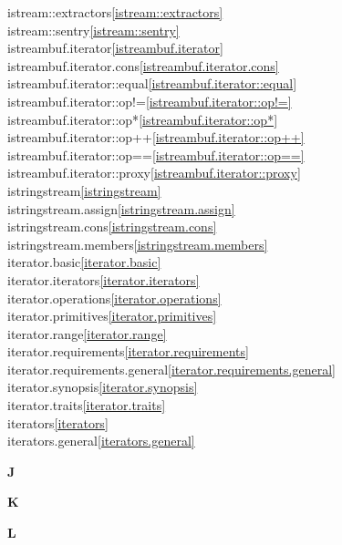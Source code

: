 \begin{multicols}{2}
istream::extractors\quad\ref{istream::extractors}\\
istream::sentry\quad\ref{istream::sentry}\\
istreambuf.iterator\quad\ref{istreambuf.iterator}\\
istreambuf.iterator.cons\quad\ref{istreambuf.iterator.cons}\\
istreambuf.iterator::equal\quad\ref{istreambuf.iterator::equal}\\
istreambuf.iterator::op!=\quad\ref{istreambuf.iterator::op!=}\\
istreambuf.iterator::op*\quad\ref{istreambuf.iterator::op*}\\
istreambuf.iterator::op++\quad\ref{istreambuf.iterator::op++}\\
istreambuf.iterator::op==\quad\ref{istreambuf.iterator::op==}\\
istreambuf.iterator::proxy\quad\ref{istreambuf.iterator::proxy}\\
istringstream\quad\ref{istringstream}\\
istringstream.assign\quad\ref{istringstream.assign}\\
istringstream.cons\quad\ref{istringstream.cons}\\
istringstream.members\quad\ref{istringstream.members}\\
iterator.basic\quad\ref{iterator.basic}\\
iterator.iterators\quad\ref{iterator.iterators}\\
iterator.operations\quad\ref{iterator.operations}\\
iterator.primitives\quad\ref{iterator.primitives}\\
iterator.range\quad\ref{iterator.range}\\
iterator.requirements\quad\ref{iterator.requirements}\\
iterator.requirements.general\quad\ref{iterator.requirements.general}\\
iterator.synopsis\quad\ref{iterator.synopsis}\\
iterator.traits\quad\ref{iterator.traits}\\
iterators\quad\ref{iterators}\\
iterators.general\quad\ref{iterators.general}\\
\par \textbf{J}\par
\par \textbf{K}\par
\par \textbf{L}\par

\end{multicols}

